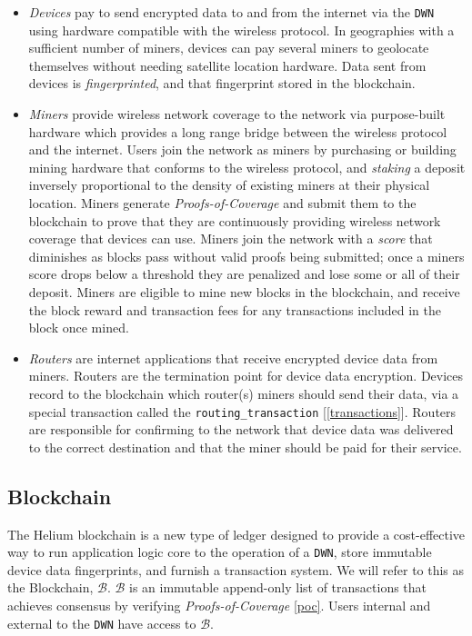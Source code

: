 \documentclass[letterpaper,11pt]{article}
\begin{document}
\begin{itemize}
	\item \textit{Devices} pay to send encrypted data to and from the internet via the \verb|DWN| using hardware compatible with the wireless protocol. In geographies with a sufficient number of miners, devices can pay several miners to geolocate themselves without needing satellite location hardware. Data sent from devices is \textit{fingerprinted}, and that fingerprint stored in the blockchain. 
	\item \textit{Miners} provide wireless network coverage to the network via purpose-built hardware which provides a long range bridge between the wireless protocol and the internet. Users join the network as miners by purchasing or building mining hardware that conforms to the wireless protocol, and \textit{staking} a deposit inversely proportional to the density of existing miners at their physical location. Miners generate \textit{Proofs-of-Coverage} and submit them to the blockchain to prove that they are continuously providing wireless network coverage that devices can use. Miners join the network with a \textit{score} that diminishes as blocks pass without valid proofs being submitted; once a miners score drops below a threshold they are penalized and lose some or all of their deposit. Miners are eligible to mine new blocks in the blockchain, and receive the block reward and transaction fees for any transactions included in the block once mined.
	\item \textit{Routers} are internet applications that receive encrypted device data from miners. Routers are the termination point for device data encryption. Devices record to the blockchain which router(s) miners should send their data, via a special transaction called the \verb|routing_transaction| [\ref{transactions}]. Routers are responsible for confirming to the network that device data was delivered to the correct destination and that the miner should be paid for their service.
\end{itemize}

\subsection{Blockchain}

The Helium blockchain is a new type of ledger designed to provide a cost-effective way to run application logic core to the operation of a \verb|DWN|, store immutable device data fingerprints, and furnish a transaction system. We will refer to this as the Blockchain, $\mathcal{B}$. $\mathcal{B}$ is an immutable append-only list of transactions that achieves consensus by verifying \textit{Proofs-of-Coverage} \ref{poc}. Users internal and external to the \verb|DWN| have access to $\mathcal{B}$.\newline
\end{document}
